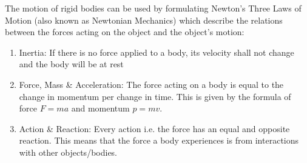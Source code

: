         The motion of rigid bodies can be used by formulating Newton’s Three Laws of Motion (also known as Newtonian Mechanics) which describe the relations between the forces acting on the object and the object’s motion:
        \begin{enumerate}[topsep=-5pt]
            \item Inertia: If there is no force applied to a body, its velocity shall not change and the body will be at rest
            \item Force, Mass \& Acceleration: The force acting on a body is equal to the change in momentum per change in time. This is given by the formula of force \(F = ma\) and momentum \(p=mv\).
            \item Action \& Reaction: Every action i.e. the force has an equal and opposite reaction. This means that the force a body experiences is from interactions with other objects/bodies.
        \end{enumerate}
        
